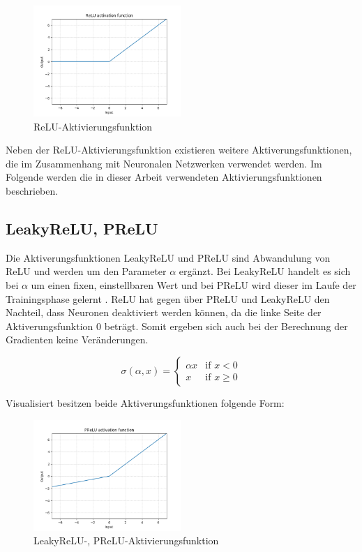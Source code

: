 \begin{figure}[H]
	\centering
	\includegraphics[width=0.50\textwidth]{resources/content/ReLU.png}
	\caption{ReLU-Aktivierungsfunktion \cite{relu_activation_function_img}}
	\label{img:relu_activation_function}
\end{figure}


Neben der ReLU-Aktivierungsfunktion existieren weitere Aktiverungsfunktionen, die im Zusammenhang mit Neuronalen Netzwerken verwendet werden.
Im Folgende werden die in dieser Arbeit verwendeten Aktivierungsfunktionen beschrieben.

\subsection{LeakyReLU, PReLU}

Die Aktiverungsfunktionen LeakyReLU und PReLU sind Abwandulung von ReLU und werden um den Parameter $ \alpha $ ergänzt. Bei LeakyReLU handelt es sich bei $ \alpha $ um einen fixen, einstellbaren Wert und bei PReLU wird dieser im Laufe der Trainingsphase gelernt \cite{DBLP:journals/corr/XuWCL15}. ReLU hat gegen über PReLU und LeakyReLU den Nachteil, dass Neuronen deaktiviert werden können, da die linke Seite der Aktiverungsfunktion 0 beträgt. Somit ergeben sich auch bei der Berechnung der Gradienten keine Veränderungen.

\begin{equation}
	\sigma(\alpha ,x) = {
		\begin{cases}
			\alpha x & {\text{if }} x < 0 \\
			x        & {\text{if }} x \geq 0
		\end{cases}
	}
\end{equation}

Visualisiert besitzen beide Aktiverungsfunktionen folgende Form:

\begin{figure}[H]
	\centering
	\includegraphics[width=0.50\textwidth]{resources/content/PReLU.png}
	\caption{LeakyReLU-, PReLU-Aktivierungsfunktion \cite{prelu_activation_function_img}}
	\label{img:prelu_activation_function}
\end{figure}

